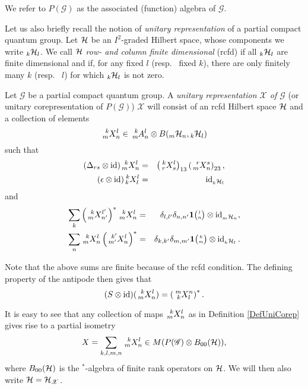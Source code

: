 We refer to $P(\mathscr{G})$ as the associated (function) algebra of $\mathscr{G}$.

Let us also briefly recall the notion of \emph{unitary representation} of a partial compact quantum group. Let $\mathcal{H}$ be an $I^2$-graded Hilbert space, whose components we write ${}_{k}\mathcal{H}_{l}$. We call $\mathcal{H}$ \emph{row- and column finite dimensional} (rcfd) if all ${}_{k}\mathcal{H}_{l}$ are finite dimensional and if, for any fixed $l$ (resp.~ fixed $k$), there are only finitely many $k$ (resp.~ $l$) for which ${}_{k}\mathcal{H}_{l}$ is not zero.  

\begin{Def}\label{DefUniCorep} Let $\mathscr{G}$ be a partial compact quantum group. A \emph{unitary representation $\mathscr{X}$ of $\mathscr{G}$} (or unitary corepresentation of $P(\mathscr{G})$) $\mathscr{X}$ will consist of an rcfd Hilbert space $\mathcal{H}$ and a collection of elements \[\Gr{X}{k}{l}{m}{n}\in \Gr{A}{k}{l}{m}{n}\otimes B(\GrDA{\Hsp}{m}{n},\GrDA{\Hsp}{k}{l})\] such that \begin{eqnarray*} (\Delta_{rs}\otimes \id)\Gr{X}{k}{l}{m}{n} &=& \left(\Gr{X}{k}{l}{r}{s}\right)_{13}\left(\Gr{X}{r}{s}{m}{n}\right)_{23},\\ (\epsilon\otimes \id)\Gr{X}{k}{l}{k}{l} &=& \id_{\GrDA{\Hsp}{k}{l}}\end{eqnarray*} and \begin{eqnarray*} \sum_{k} \left(\Gr{X}{k}{l'}{m}{n'}\right)^*\Gr{X}{k}{l}{m}{n} &=& \delta_{l,l'}  \delta_{n,n'} \UnitC{l}{n}\otimes \id_{\GrDA{\Hsp}{m}{n}},\\ \sum_{n} \Gr{X}{k}{l}{m}{n}\left(\Gr{X}{k'}{l}{m'}{n}\right)^* &=& \delta_{k,k'}\delta_{m,m'} \UnitC{k}{m}\otimes \id_{\GrDA{\Hsp}{k}{l}}.\end{eqnarray*}
\end{Def} 

Note that the above sums are finite because of the rcfd condition. The defining property of the antipode then gives that \[(S\otimes \id)(\Gr{X}{k}{l}{m}{n}) = \left(\Gr{X}{m}{n}{k}{l}\right)^*.\]

It is easy to see that any collection of maps $\Gr{X}{k}{l}{m}{n}$ as in Definition \ref{DefUniCorep} gives rise to a partial isometry \[X = \sum_{k,l,m,n}\Gr{X}{k}{l}{m}{n}\in M(P(\mathscr{G})\otimes B_{00}(\Hsp)),\] where $B_{00}(\mathcal{H})$ is the $^*$-algebra of finite rank operators on $\mathcal{H}$. We will then also write $\mathcal{H} = \mathcal{H}_{\mathscr{X}}$.


